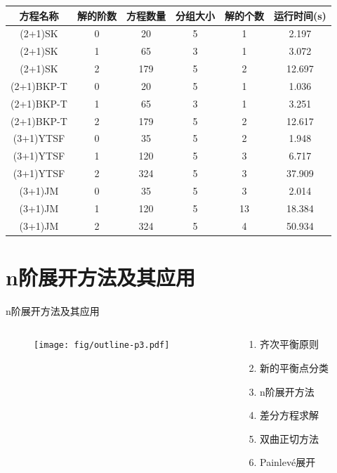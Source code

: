 \documentclass[handout]{beamer}
\newcommand{\Painleve}{Painlev{\'e}}
\begin{document}
\begin{frame}

\begin{adjustbox}{max width=\textwidth}
\renewcommand{\arraystretch}{1.3}
\begin{tabular}{cccccc}
\hline
方程名称    & 解的阶数 & 方程数量 & 分组大小 & 解的个数 & 运行时间(s) \\ 
\hline 
(2+1)SK & 0 & 20 & 5 & 1 & 2.197 \\
(2+1)SK & 1 & 65 & 3 & 1 & 3.072 \\
(2+1)SK & 2 & 179 & 5 & 2 & 12.697 \\
(2+1)BKP-T & 0 & 20 & 5 & 1 & 1.036 \\
(2+1)BKP-T & 1 & 65 & 3 & 1 & 3.251 \\
(2+1)BKP-T & 2 & 179 & 5 & 2 & 12.617 \\
(3+1)YTSF & 0 & 35 & 5 & 2 & 1.948 \\
(3+1)YTSF & 1 & 120 & 5 & 3 & 6.717 \\
(3+1)YTSF & 2 & 324 & 5 & 3 & 37.909 \\
(3+1)JM & 0 & 35 & 5 & 3 & 2.014 \\
(3+1)JM & 1 & 120 & 5 & 13 & 18.384 \\
(3+1)JM & 2 & 324 & 5 & 4 & 50.934 \\
\hline 
\end{tabular}
\end{adjustbox}

\end{frame}

\section{n阶展开方法及其应用}
\begin{frame}{n阶展开方法及其应用}
\begin{columns}
\begin{column}{0.5\textwidth}
  \begin{figure}
    \centering
    \texttt{[image: fig/outline-p3.pdf]}
  \end{figure}
\end{column}
\begin{column}{0.5\textwidth}
  \begin{enumerate}
  \item 齐次平衡原则
  \item 新的平衡点分类
  \item n阶展开方法
  \item 差分方程求解
  \item 双曲正切方法 
  \item \Painleve{}展开
  \end{enumerate}
\end{column}
\end{columns}
\end{frame}
\end{document}
